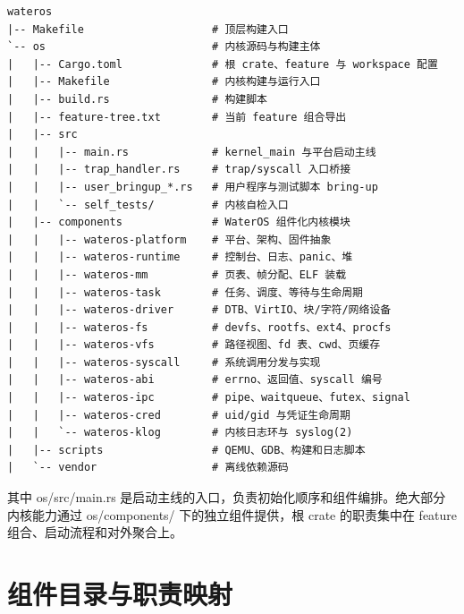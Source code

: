 \documentclass[12pt,openany,oneside,AutoFakeBold=true]{ctexbook}
\newcommand{\code}[1]{\textnormal{\rmfamily #1}}
\begin{document}
\begin{lstlisting}
wateros
|-- Makefile                    # 顶层构建入口
`-- os                          # 内核源码与构建主体
|   |-- Cargo.toml              # 根 crate、feature 与 workspace 配置
|   |-- Makefile                # 内核构建与运行入口
|   |-- build.rs                # 构建脚本
|   |-- feature-tree.txt        # 当前 feature 组合导出
|   |-- src
|   |   |-- main.rs             # kernel_main 与平台启动主线
|   |   |-- trap_handler.rs     # trap/syscall 入口桥接
|   |   |-- user_bringup_*.rs   # 用户程序与测试脚本 bring-up
|   |   `-- self_tests/         # 内核自检入口
|   |-- components              # WaterOS 组件化内核模块
|   |   |-- wateros-platform    # 平台、架构、固件抽象
|   |   |-- wateros-runtime     # 控制台、日志、panic、堆
|   |   |-- wateros-mm          # 页表、帧分配、ELF 装载
|   |   |-- wateros-task        # 任务、调度、等待与生命周期
|   |   |-- wateros-driver      # DTB、VirtIO、块/字符/网络设备
|   |   |-- wateros-fs          # devfs、rootfs、ext4、procfs
|   |   |-- wateros-vfs         # 路径视图、fd 表、cwd、页缓存
|   |   |-- wateros-syscall     # 系统调用分发与实现
|   |   |-- wateros-abi         # errno、返回值、syscall 编号
|   |   |-- wateros-ipc         # pipe、waitqueue、futex、signal
|   |   |-- wateros-cred        # uid/gid 与凭证生命周期
|   |   `-- wateros-klog        # 内核日志环与 syslog(2)
|   |-- scripts                 # QEMU、GDB、构建和日志脚本
|   `-- vendor                  # 离线依赖源码
\end{lstlisting}

其中 \code{os/src/main.rs} 是启动主线的入口，负责初始化顺序和组件编排。绝大部分内核能力通过 \code{os/components/} 下的独立组件提供，根 crate 的职责集中在 feature 组合、启动流程和对外聚合上。

\section{组件目录与职责映射}
\end{document}
